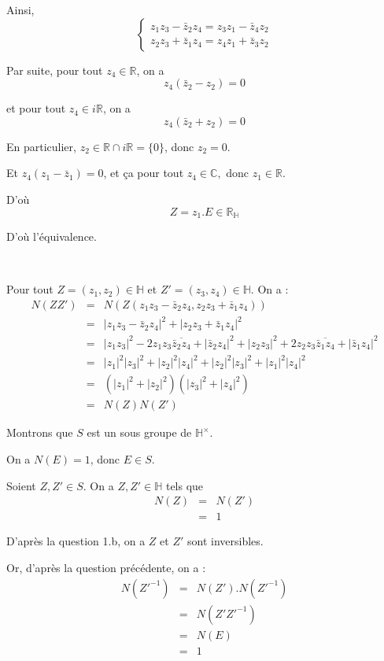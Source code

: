 Ainsi,
\[ \left\{\begin{array}{l}
     z_1 z_3 - \bar{z}_2 z_4 = z_3 z_1 - \bar{z}_4 z_2\\
     z_2 z_3 + \bar{z}_1 z_4 = z_4 z_1 + \bar{z}_3 z_2
   \end{array}\right. \]


Par suite, pour tout $z_4 \in \mathbb{R}$, on a
\[ z_4 (\bar{z}_2 - z_2) = 0 \]


et pour tout $z_4 \in i\mathbb{R}$, on a
\[ z_4 (\bar{z}_2 + z_2) = 0 \]


En particulier, $z_2 \in \mathbb{R} \cap i\mathbb{R}= \{ 0 \}$, donc $z_2 =
0$.

Et $z_4 (z_1 - \bar{z}_1) = 0$, et {\c c}a pour tout $z_4 \in \mathbb{C},$
donc $z_1 \in \mathbb{R}.$

D'o{\`u}
\[ Z = z_1 .E \in \mathbb{R}_{\mathbb{H}} \]


D'o{\`u} l'{\'e}quivalence.

\

 Pour tout $Z = (z_1, z_2) \in \mathbb{H}$ et $Z' = (z_3, z_4)
\in \mathbb{H}$. On a :
\begin{eqnarray*}
  N (Z Z') & = & N (Z (z_1 z_3 - \bar{z}_2 z_4, z_2 z_3 + \bar{z}_1 z_4))\\
  & = & | z_1 z_3 - \bar{z}_2 z_4 |^2 + | z_2 z_3 + \bar{z}_1 z_4 |^2\\
  & = & | z_1 z_3 |^2 - 2 z_1 z_3 \overline{\bar{z}_2 z_4} + | \bar{z}_2 z_4
  |^2 + | z_2 z_3 |^2 + 2 z_2 z_3 \overline{\bar{z}_1 z_4} + | \bar{z}_1 z_4
  |^2\\
  & = & | z_1 |^2 | z_3 |^2 + | z_2 |^2 | z_4 |^2 + | z_2 |^2 | z_3 |^2 + |
  z_1 |^2 | z_4 |^2\\
  & = & (| z_1 |^2 + | z_2 |^2) (| z_3 |^2 + | z_4 |^2)\\
  & = & N (Z) N (Z')
\end{eqnarray*}


 Montrons que $S$ est un sous groupe de $\mathbb{H}^{\times}$.

On a $N (E) = 1$, donc $E \in S$.

Soient $Z, Z' \in S$. On a $Z, Z' \in \mathbb{H}$ tels que
\begin{eqnarray*}
  N (Z) & = & N (Z')\\
  & = & 1
\end{eqnarray*}


D'apr{\`e}s la question 1.b, on a $Z$ et $Z'$ sont inversibles.

Or, d'apr{\`e}s la question pr{\'e}c{\'e}dente, on a :
\begin{eqnarray*}
  N \left( {Z'}^{- 1} \right) & = & N (Z') .N \left( {Z'}^{- 1} \right)\\
  & = & N \left( Z' {Z'}^{- 1} \right)\\
  & = & N (E)\\
  & = & 1
\end{eqnarray*}


